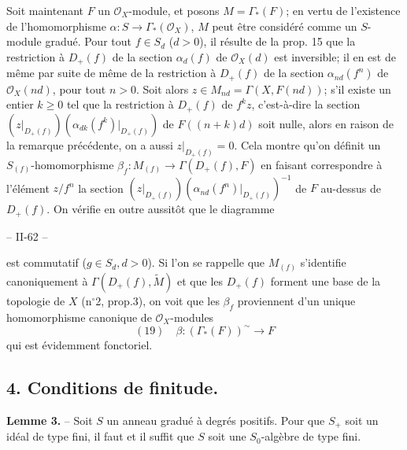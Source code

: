 Soit maintenant $F$ un $\mathcal{O}_X$-module, et posons $M = \Gamma_*(F)$; en vertu de l'existence de l'homomorphisme $\alpha: S \to \Gamma_*(\mathcal{O}_X)$, $M$ peut être considéré comme un $S$-module gradué. Pour tout $f \in S_d$ ($d>0$), il résulte de la prop. 15 que la restriction à $D_+(f)$ de la section $\alpha_d(f)$ de $\mathcal{O}_X(d)$ est inversible; il en est de même par suite de même de la restriction à $D_+(f)$ de la section $\alpha_{nd}(f^n)$ de $\mathcal{O}_X(nd)$, pour tout $n>0$. Soit alors $z \in M_{nd} = \Gamma(X, F(nd))$; s'il existe un entier $k \ge 0$ tel que la restriction à $D_+(f)$ de $f^k z$, c'est-à-dire la section $(z|_{D_+(f)})(\alpha_{dk}(f^k)|_{D_+(f)})$ de $F((n+k)d)$ soit nulle, alors en raison de la remarque précédente, on a aussi $z|_{D_+(f)} = 0$. Cela montre qu'on définit un $S_{(f)}$-homomorphisme $\beta_f : M_{(f)} \to \Gamma(D_+(f), F)$ en faisant correspondre à l'élément $z/f^n$ la section $(z|_{D_+(f)})(\alpha_{nd}(f^n)|_{D_+(f)})^{-1}$ de $F$ au-dessus de $D_+(f)$. On vérifie en outre aussitôt que le diagramme


\newpage


\begin{center}
-- II-62 --
\end{center}

est commutatif ($g \in S_d, d > 0$). Si l'on se rappelle que $M_{(f)}$ s'identifie canoniquement à $\Gamma(D_+(f), \tilde{M})$ et que les $D_+(f)$ forment une base de la topologie de $X$ (n$^\circ$2, prop.3), on voit que les $\beta_f$ proviennent d'un unique homomorphisme canonique de $\mathcal{O}_X$-modules
$$(19) \quad \beta : (\Gamma_*(F))^\sim \to F$$
qui est évidemment fonctoriel.

\subsection*{4. Conditions de finitude.}

\textbf{Lemme 3.} -- Soit $S$ un anneau gradué à degrés positifs. Pour que $S_+$ soit un idéal de type fini, il faut et il suffit que $S$ soit une $S_0$-algèbre de type fini.

